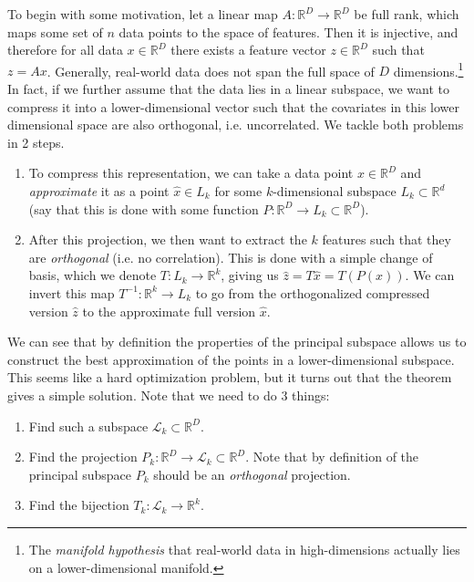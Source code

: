   To begin with some motivation, let a linear map $A: \mathbb{R}^D \rightarrow \mathbb{R}^D$ be full rank, which maps some set of $n$ data points to the space of features. Then it is injective, and therefore for all data $x \in \mathbb{R}^D$ there exists a feature vector $z \in \mathbb{R}^D$ such that $z = Ax$. Generally, real-world data does not span the full space of $D$ dimensions.\footnote{The \textit{manifold hypothesis} that real-world data in high-dimensions actually lies on a lower-dimensional manifold. } In fact, if we further assume that the data lies in a linear subspace, we want to compress it into a lower-dimensional vector such that the covariates in this lower dimensional space are also orthogonal, i.e. uncorrelated. We tackle both problems in 2 steps. 
  \begin{enumerate}
    \item To compress this representation, we can take a data point $x \in \mathbb{R}^D$ and \textit{approximate} it as a point $\hat{x} \in L_k$ for some $k$-dimensional subspace $L_k \subset \mathbb{R}^d$ (say that this is done with some function $P: \mathbb{R}^D \rightarrow L_k \subset \mathbb{R}^D$). 
    \item After this projection, we then want to extract the $k$ features such that they are \textit{orthogonal} (i.e. no correlation). This is done with a simple change of basis, which we denote $T: L_k \rightarrow \mathbb{R}^k$, giving us $\hat{z} = T \hat{x} = T (P(x))$. We can invert this map $T^{-1} : \mathbb{R}^k \rightarrow L_k$ to go from the orthogonalized compressed version $\hat{z}$ to the approximate full version $\hat{x}$.
  \end{enumerate}

  We can see that by definition the properties of the principal subspace allows us to construct the best approximation of the points in a lower-dimensional subspace. This seems like a hard optimization problem, but it turns out that the theorem gives a simple solution. Note that we need to do 3 things: 
  \begin{enumerate}
    \item Find such a subspace $\mathcal{L}_k \subset \mathbb{R}^D$. 
    \item Find the projection $P_k: \mathbb{R}^D \rightarrow \mathcal{L}_k \subset \mathbb{R}^D$. Note that by definition of the principal subspace $P_k$ should be an \textit{orthogonal} projection. 
    \item Find the bijection $T_k: \mathcal{L}_k \rightarrow \mathbb{R}^k$. 
  \end{enumerate}

